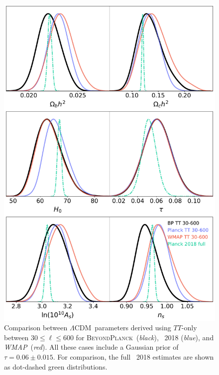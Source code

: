 \documentclass[twocolumn]{aa}
\def\WMAP{\textit{WMAP}}
\def\LCDM{$\Lambda$CDM}
\newcommand{\BP}{\textsc{BeyondPlanck}}
\begin{document}
\begin{figure}[t]
	\center
	\includegraphics[width=\linewidth]{figs/BP10_LCDM_30-600.pdf}
	\caption{Comparison between \LCDM\ parameters derived using
          $TT$-only between $30\le\ell\le600$ for
          \BP\ (\emph{black}), \Planck\ 2018 (\emph{blue}), and
          \WMAP\ (\emph{red}).  All these cases include a Gaussian
          prior of $\tau=0.06\pm0.015$.  For comparison, the full
          \Planck\ 2018 estimates are shown as dot-dashed green
          distributions.}
	\label{fig:GBR-600}	
\end{figure}
 
\end{document}
